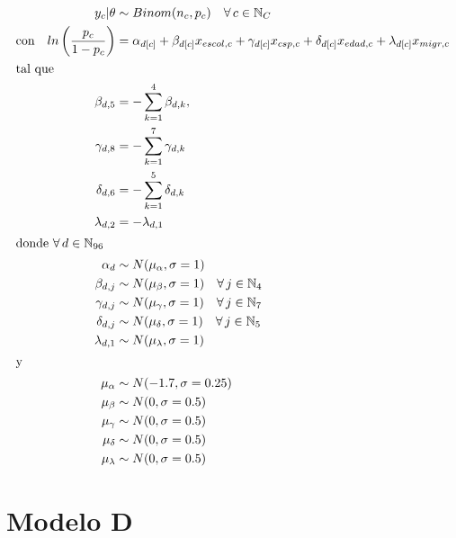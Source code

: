\begin{align}\label{eq:Modelo_Comp_C}
y_c|\theta & \sim Binom(n_c,p_c) \quad \forall \, c \in \mathbb{N}_C \nonumber \\
\text{con} \quad ln\left(\dfrac{p_c}{1-p_c}\right) &= \alpha_{d[c]} + \beta_{d[c]} x_{escol,c} + \gamma_{d[c]} x_{csp,c} + \delta_{d[c]} x_{edad,c} + \lambda_{d[c]} x_{migr,c} \\ 
\intertext{tal que} 
\beta_{d,5} &= -\sum\limits_{k = 1}^{4} \beta_{d,k}, \nonumber \\
\gamma_{d,8} &= -\sum\limits_{k = 1}^{7} \gamma_{d,k} \nonumber \\
\delta_{d,6} &= -\sum\limits_{k = 1}^{5} \delta_{d,k} \nonumber \\
\lambda_{d,2} &= -\lambda_{d,1} \nonumber \\
\intertext{donde $\forall \, d \in \mathbb{N}_{96}$}
\alpha_d & \sim N(\mu_{\alpha}, \sigma=1) \quad  \nonumber \\
\beta_{d,j} & \sim N(\mu_{\beta}, \sigma=1) \quad \forall \, j \in \mathbb{N}_{4} \nonumber \\
\gamma_{d,j} & \sim N(\mu_{\gamma}, \sigma=1) \quad \forall \, j \in \mathbb{N}_{7} \nonumber \\
\delta_{d,j} & \sim N(\mu_{\delta}, \sigma=1) \quad \forall \, j \in \mathbb{N}_{5} \nonumber \\
\lambda_{d,1} & \sim N(\mu_{\lambda}, \sigma=1) \nonumber \\
\intertext{y}
\mu_{\alpha} &\sim N(-1.7,\sigma=0.25) \nonumber \\
\mu_{\beta} &\sim N(0,\sigma=0.5) \nonumber \\
\mu_{\gamma} &\sim N(0,\sigma=0.5) \nonumber \\
\mu_{\delta} &\sim N(0,\sigma=0.5) \nonumber \\
\mu_{\lambda} &\sim N(0,\sigma=0.5) \nonumber
\end{align}

\section*{Modelo D}


